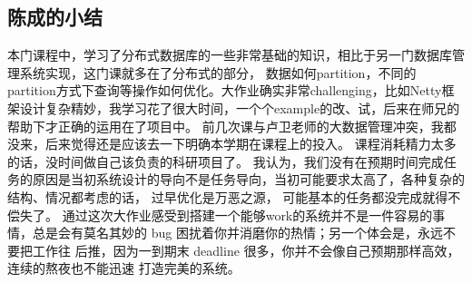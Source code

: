 \documentclass[a4paper, 12pt]{ctexart}
\begin{document}
\subsection{陈成的小结}
本门课程中，学习了分布式数据库的一些非常基础的知识，相比于另一门数据库管理系统实现，这门课就多在了分布式的部分，
数据如何partition，不同的partition方式下查询等操作如何优化。大作业确实非常challenging，比如Netty框架设计复杂精妙，我学习花了很大时间，一个个example的改、试，后来在师兄的帮助下才正确的运用在了项目中。
前几次课与卢卫老师的大数据管理冲突，我都没来，后来觉得还是应该去一下明确本学期在课程上的投入。
课程消耗精力太多的话，没时间做自己该负责的科研项目了。
我认为，我们没有在预期时间完成任务的原因是当初系统设计的导向不是任务导向，当初可能要求太高了，各种复杂的结构、情况都考虑的话，
过早优化是万恶之源，
可能基本的任务都没完成就得不偿失了。
通过这次大作业感受到搭建一个能够work的系统并不是一件容易的事
情，总是会有莫名其妙的 bug 困扰着你并消磨你的热情；另一个体会是，永远不要把工作往
后推，因为一到期末 deadline 很多，你并不会像自己预期那样高效，连续的熬夜也不能迅速
打造完美的系统。




 
\end{document}
